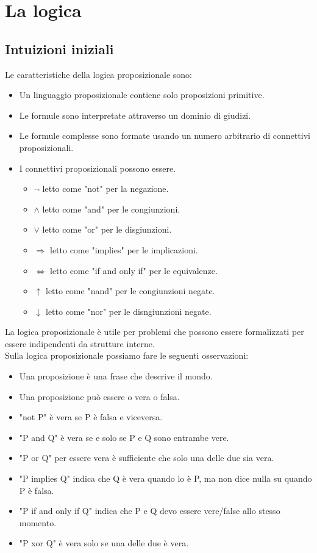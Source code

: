 \documentclass[../main.tex]{subfiles}
\begin{document}
    \chapter{La logica}
    \section{Intuizioni iniziali}
    Le caratteristiche della logica proposizionale sono:
    \begin{itemize}
        \item Un linguaggio proposizionale contiene solo proposizioni primitive.
        \item Le formule sono interpretate attraverso un dominio di giudizi.
        \item Le formule complesse sono formate usando un numero arbitrario di connettivi proposizionali.
        \item I connettivi proposizionali possono essere.
        \begin{itemize}
            \item $\lnot$ letto come "not" per la negazione.
            \item $\land$ letto come "and" per le congiunzioni.
            \item $\lor$ letto come "or" per le disgiunzioni.
            \item $\Longrightarrow$ letto come "implies" per le implicazioni.
            \item $\Longleftrightarrow$ letto come "if and only if" per le equivalenze.
            \item $\uparrow$ letto come "nand" per le congiunzioni negate.
            \item $\downarrow$ letto come "nor" per le disngiunzioni negate.
        \end{itemize} 
    \end{itemize}
    La logica proposizionale è utile per problemi che possono essere formalizzati per essere indipendenti da strutture interne.\\
    Sulla logica proposizionale possiamo fare le seguenti osservazioni:
    \begin{itemize}
        \item Una proposizione è una frase che descrive il mondo.
        \item Una proposizione può essere o vera o falsa.
        \item "not P" è vera se P è falsa e viceversa.
        \item "P and Q" è vera se e solo se P e Q sono entrambe vere.
        \item "P or Q" per essere vera è sufficiente che solo una delle due sia vera.
        \item "P implies Q" indica che Q è vera quando lo è P, ma non dice nulla su quando P è falsa.
        \item "P if and only if Q" indica che P e Q devo essere vere/false allo stesso momento.
        \item "P xor Q" è vera solo se una delle due è vera.
    \end{itemize}
\end{document}
